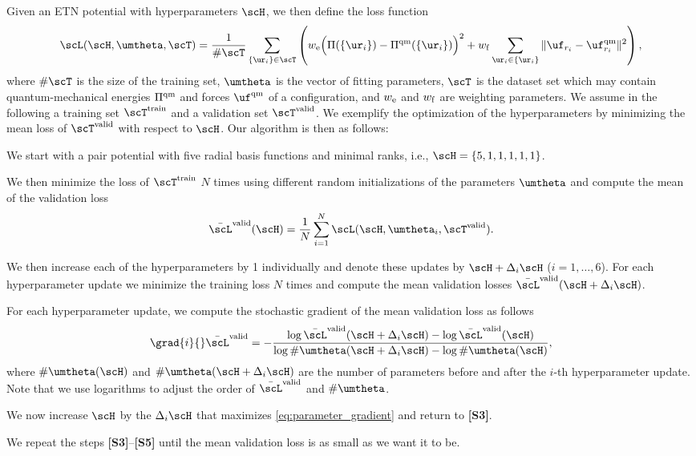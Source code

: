 Given an ETN potential with hyperparameters $\scH$, we then define the loss function
\begin{equation}
    \scL(\scH,\umtheta,\scT) =
    \frac{1}{\#\scT}
    \sum_{\{ \ur_{i} \} \in \scT} \left(
	w_{\rm e} \Big( \Pi (\{ \ur_{i} \}) - \Pi^{\rm qm}(\{ \ur_{i} \}) \Big)^2
	+
	w_{\rm f} \sum_{\ur_i \in \{ \ur_{i} \}} \| \uf_{r_i} - \uf^{\rm qm}_{r_i} \|^2
    \right)
    ,
\end{equation}
where $\#\scT$ is the size of the training set, $\umtheta$ is the vector of fitting parameters, $\scT$ is the dataset set which may contain quantum-mechanical energies $\Pi^{\rm qm}$ and forces $\uf^{\rm qm}$ of a configuration, and $w_{\rm e}$ and $w_{\rm f}$ are weighting parameters.
We assume in the following a training set $\scT^{\rm train}$ and a validation set $\scT^{\rm valid}$.
We exemplify the optimization of the hyperparameters by minimizing the mean loss of $\scT^{\rm valid}$ with respect to $\scH$.
Our algorithm is then as follows:
\begin{enumerate}[label={\bf [S\arabic*]}]
    \item
    We start with a pair potential with five radial basis functions and minimal ranks, i.e., $\scH = \{5,1,1,1,1,1\}$.
    \item
    We then minimize the loss of $\scT^{\rm train}$ $N$ times using different random initializations of the parameters $\umtheta$ and compute the mean of the validation loss
    \begin{equation}
        \bar{\scL}^\mathrm{valid}(\scH) = \frac{1}{N} \sum_{i=1}^N \scL(\scH,\umtheta_i,\scT^{\rm valid}).
    \end{equation}
    \item
    We then increase each of the hyperparameters by 1 individually and denote these updates by $\scH + \Delta_i\scH$ ($i=1,\ldots,6$).
    For each hyperparameter update we minimize the training loss $N$ times and compute the mean validation losses $\bar{\scL}^\mathrm{valid}(\scH + \Delta_i\scH)$.
    \item
    For each hyperparameter update, we compute the stochastic gradient of the mean validation loss as follows
    \begin{equation}\label{eq:parameter_gradient}
        \grad{i}{} \bar{\scL}^\mathrm{valid} = - \frac{\log\bar{\scL}^\mathrm{valid}(\scH + \Delta_i\scH) - \log\bar{\scL}^\mathrm{valid}(\scH)}{\log\#\umtheta(\scH + \Delta_i\scH) - \log\#\umtheta(\scH)},
    \end{equation}
    where $\#\umtheta(\scH)$ and $\#\umtheta(\scH + \Delta_i\scH)$ are the number of parameters before and after the $i$-th hyperparameter update.
    Note that we use logarithms to adjust the order of $\bar{\scL}^\mathrm{valid}$ and $\#\umtheta$.
    \item
    We now increase $\scH$ by the $\Delta_i\scH$ that maximizes \eqref{eq:parameter_gradient} and return to {\bf [S3]}.
\end{enumerate}
We repeat the steps {\bf [S3]}--{\bf [S5]} until the mean validation loss is as small as we want it to be.


